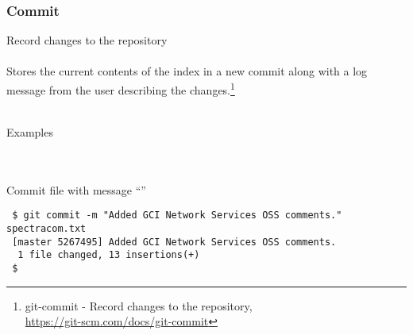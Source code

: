 
\newpage
\subsubsection{Commit}
Record changes to the repository
\\
\\
Stores the current contents of the index in a new commit along with
a log message from the user describing the changes.\footnote{git-commit - Record changes to the repository,\\
\href{https://git-scm.com/docs/git-commit}{https://git-scm.com/docs/git-commit}}
\\
\\

\noindent \begin{bf}Examples\end{bf}
\\
\\
\noindent Commit  file with message
``''
\begin{Verbatim}
 $ git commit -m "Added GCI Network Services OSS comments." spectracom.txt
 [master 5267495] Added GCI Network Services OSS comments.
  1 file changed, 13 insertions(+)
 $ 
\end{Verbatim}
